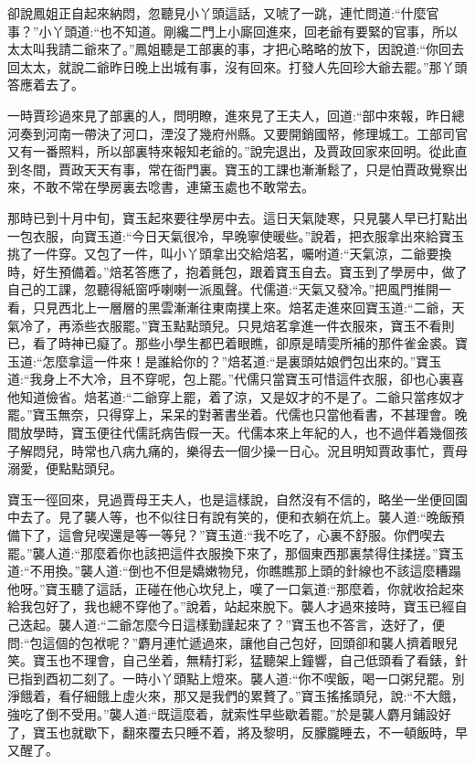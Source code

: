 

\begin{parag}
    卻說鳳姐正自起來納悶，忽聽見小丫頭這話，又唬了一跳，連忙問道:“什麼官事？”小丫頭道:“也不知道。剛纔二門上小廝回進來，回老爺有要緊的官事，所以太太叫我請二爺來了。”鳳姐聽是工部裏的事，才把心略略的放下，因說道:“你回去回太太，就說二爺昨日晚上出城有事，沒有回來。打發人先回珍大爺去罷。”那丫頭答應着去了。
\end{parag}


\begin{parag}
    一時賈珍過來見了部裏的人，問明瞭，進來見了王夫人，回道:“部中來報，昨日總河奏到河南一帶決了河口，湮沒了幾府州縣。又要開銷國帑，修理城工。工部司官又有一番照料，所以部裏特來報知老爺的。”說完退出，及賈政回家來回明。從此直到冬間，賈政天天有事，常在衙門裏。寶玉的工課也漸漸鬆了，只是怕賈政覺察出來，不敢不常在學房裏去唸書，連黛玉處也不敢常去。
\end{parag}


\begin{parag}
    那時已到十月中旬，寶玉起來要往學房中去。這日天氣陡寒，只見襲人早已打點出一包衣服，向寶玉道:“今日天氣很冷，早晚寧使暖些。”說着，把衣服拿出來給寶玉挑了一件穿。又包了一件，叫小丫頭拿出交給焙茗，囑咐道:“天氣涼，二爺要換時，好生預備着。”焙茗答應了，抱着氈包，跟着寶玉自去。寶玉到了學房中，做了自己的工課，忽聽得紙窗呼喇喇一派風聲。代儒道:“天氣又發冷。”把風門推開一看，只見西北上一層層的黑雲漸漸往東南撲上來。焙茗走進來回寶玉道:“二爺，天氣冷了，再添些衣服罷。”寶玉點點頭兒。只見焙茗拿進一件衣服來，寶玉不看則已，看了時神已癡了。那些小學生都巴着眼瞧，卻原是晴雯所補的那件雀金裘。寶玉道:“怎麼拿這一件來！是誰給你的？”焙茗道:“是裏頭姑娘們包出來的。”寶玉道:“我身上不大冷，且不穿呢，包上罷。”代儒只當寶玉可惜這件衣服，卻也心裏喜他知道儉省。焙茗道:“二爺穿上罷，着了涼，又是奴才的不是了。二爺只當疼奴才罷。”寶玉無奈，只得穿上，呆呆的對著書坐着。代儒也只當他看書，不甚理會。晚間放學時，寶玉便往代儒託病告假一天。代儒本來上年紀的人，也不過伴着幾個孩子解悶兒，時常也八病九痛的，樂得去一個少操一日心。況且明知賈政事忙，賈母溺愛，便點點頭兒。
\end{parag}


\begin{parag}
    寶玉一徑回來，見過賈母王夫人，也是這樣說，自然沒有不信的，略坐一坐便回園中去了。見了襲人等，也不似往日有說有笑的，便和衣躺在炕上。襲人道:“晚飯預備下了，這會兒喫還是等一等兒？”寶玉道:“我不吃了，心裏不舒服。你們喫去罷。”襲人道:“那麼着你也該把這件衣服換下來了，那個東西那裏禁得住揉搓。”寶玉道:“不用換。”襲人道:“倒也不但是嬌嫩物兒，你瞧瞧那上頭的針線也不該這麼糟蹋他呀。”寶玉聽了這話，正碰在他心坎兒上，嘆了一口氣道:“那麼着，你就收拾起來給我包好了，我也總不穿他了。”說着，站起來脫下。襲人才過來接時，寶玉已經自己迭起。襲人道:“二爺怎麼今日這樣勤謹起來了？”寶玉也不答言，迭好了，便問:“包這個的包袱呢？”麝月連忙遞過來，讓他自己包好，回頭卻和襲人擠着眼兒笑。寶玉也不理會，自己坐着，無精打彩，猛聽架上鐘響，自己低頭看了看錶，針已指到酉初二刻了。一時小丫頭點上燈來。襲人道:“你不喫飯，喝一口粥兒罷。別淨餓着，看仔細餓上虛火來，那又是我們的累贅了。”寶玉搖搖頭兒，說:“不大餓，強吃了倒不受用。”襲人道:“既這麼着，就索性早些歇着罷。”於是襲人麝月鋪設好了，寶玉也就歇下，翻來覆去只睡不着，將及黎明，反朦朧睡去，不一頓飯時，早又醒了。
\end{parag}


